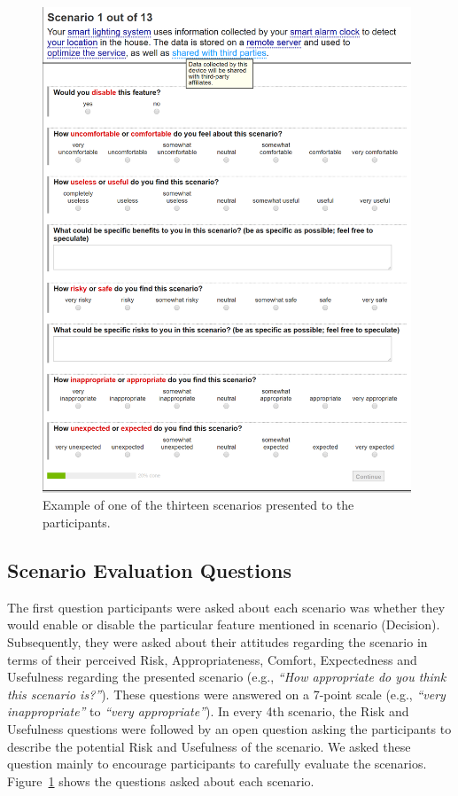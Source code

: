 \begin{figure}
	\centering
	\includegraphics[width=0.98\textwidth]{figures/scenario.png}
	\caption{Example of one of the thirteen scenarios presented to the participants.}
	\label{fig:scenario}
\end{figure}

\subsection{Scenario Evaluation Questions}
\label{sec:questions}
The first question participants were asked about each scenario was whether they would enable or disable the particular feature mentioned in scenario (Decision). Subsequently, they were asked about their attitudes regarding the scenario in terms of their perceived Risk, Appropriateness, Comfort, Expectedness and Usefulness regarding the presented scenario (e.g., \emph{``How appropriate do you think this scenario is?''}). These questions were answered on a 7-point scale (e.g., \emph{``very inappropriate''} to \emph{``very appropriate''}). In every 4th scenario, the Risk and Usefulness questions were followed by an open question asking the participants to describe the potential Risk and Usefulness of the scenario. We asked these question mainly to encourage participants to carefully evaluate the scenarios. Figure~\ref{fig:scenario} shows the questions asked about each scenario.

